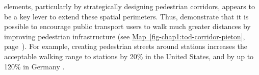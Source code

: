 \begin{refsegment}
 elements, particularly by strategically designing pedestrian corridors, appears to be a key lever to extend these spatial perimeters. Thus, \textcolor{blue}{\textcite[163]{park_can_2015}} demonstrate that it is possible to encourage public transport users to walk much greater distances by improving pedestrian infrastructure (see \hyperref[fig-chap1:tod-corridor-pieton]{Map~\ref{fig-chap1:tod-corridor-pieton}}, page~\pageref{fig-chap1:tod-corridor-pieton}). For example, creating pedestrian streets around stations increases the acceptable walking range to stations by 20\% in the United States, and by up to 120\% in Germany \textcolor{blue}{\autocite[151]{zielstra_comparative_2011}}.%


\end{refsegment}
